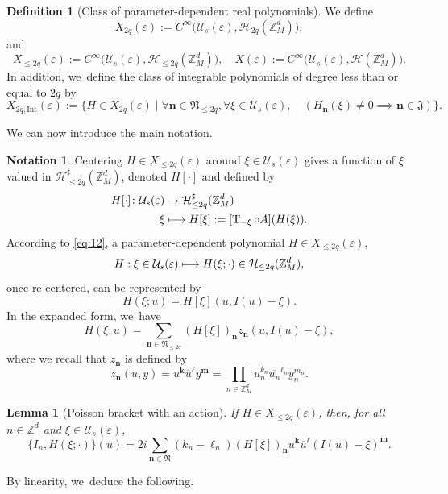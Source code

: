 \documentclass[JEP,XML,SOM,Unicode,published]{cedram}
\newcommand\mto{\mathchoice{\longmapsto}{\mapsto}{\mapsto}{\mapsto}}
\theoremstyle{plain}
\newtheorem{lemma}[theorem]{Lemma}
\theoremstyle{definition}
\newtheorem{definition}[theorem]{Definition}
\newtheorem{notation}[theorem]{Notation}
\newcommand{\nb}{{\boldsymbol n}}
\newcommand{\kb}{{\boldsymbol k}}
\newcommand{\lb}{{\boldsymbol \ell}}
\newcommand{\mb}{{\boldsymbol m}}
\newcommand{\Nb}{{\boldsymbol{\mathfrak{N}}}}
\newcommand{\Z}{\mathbb{Z}}
\newcommand{\1}{\mathbf{1}}
\let\epsilon\varepsilon
\begin{document}
\begin{definition}[Class of parameter-dependent real polynomials]
\label{def:class}
We define
\begin{equation}
\label{eq:X}
X_{2q}(\epsilon):= C^{\infty}
\big(
\mathcal{U}_{s}(\epsilon),\mathcal{H}_{2q}(\Z_{M}^{d})
\big),
\end{equation}
and
\[
X_{\leq 2q}(\epsilon):= C^{\infty}
\big(
\mathcal{U}_{s}(\epsilon),\mathcal{H}_{\leq 2q}(\Z_{M}^{d})
\big),
\quad
X(\epsilon):= C^{\infty}
\big(
\mathcal{U}_{s}(\epsilon),\mathcal{H}(\Z_{M}^{d})
\big).
\]
In addition, we~define the class of integrable polynomials of degree less than or equal to $2q$ by
\[
X_{2q,\mathrm{Int}}(\epsilon) :=
\{
H\in X_{2q}(\epsilon)\mid \forall \nb\in\Nb_{\leq2q},\forall \xi\in\mathcal{U}_{s}(\epsilon),\quad (H_{\nb}(\xi)\neq0 \implies \nb\in\mathfrak{J})
\}.
\]
\end{definition}

We can now introduce the main notation.
\begin{notation}
\label{not}
Centering $H\in X_{\leq2q}(\epsilon)$ around $\xi\in\mathcal{U}_{s}(\epsilon)$ gives a function of $\xi$ valued in $\mathcal{H}_{\leq 2q}^{\sharp}(\Z_{M}^{d})$, denoted $H[\cdot]$ and defined by
\[
\begin{aligned}
H[\cdot]\colon\mathcal{U}_{s}(\epsilon)&
\to\mathcal{H}_{\leq 2q}^{\sharp}(\Z_{M}^{d})\\
\xi&\mto H[\xi]:=[\operatorname{T}_{-\xi}\circ A](H(\xi)).
\end{aligned}
\]
According to \eqref{eq:12}, a parameter-dependent polynomial $H\in X_{\leq2q}(\epsilon)$,
\[
H: \xi\in\mathcal{U}_{s}(\epsilon)\mto H(\xi;\cdot) \in \mathcal{H}_{\leq2q}(\Z_{M}^{d}),
\]
once re-centered, can be represented by
\begin{equation}
\label{eq:H-cano}
H(\xi;u) = H[\xi](u,I(u)-\xi).
\end{equation}
In the expanded form, we~have
\[
H(\xi;u) = \sum_{\nb\in\Nb_{\leq2q}}(H[\xi])_{\nb}z_{\nb}(u,I(u)-\xi),
\]
where we recall that $z_{\nb}$ is defined by
\[
z_{\nb}(u,y) = u^{\kb}\overline{u}^{\lb}y^{\mb} = \prod_{n\in\Z_{M}^{d}}u_{n}^{k_{n}}\overline{u_{n}}^{\ell_{n}}y_{n}^{m_{n}}.
\]
\end{notation}

\begin{lemma}[Poisson bracket with an action] If $H\in X_{\leq2q}(\epsilon)$, then, for all $n\in\Z^{d}$ and $\xi\in\mathcal{U}_{s}(\epsilon)$,
\begin{equation}
\label{eq:brak-I}
\{I_{n},H(\xi;\cdot)\}(u)
= 2i\sum_{\nb\in\Nb}(k_{n}-\ell_{n})(H[\xi])_{\nb}u^{\kb}\overline{u}^{\lb}(I(u)-\xi)^{\mb}.
\end{equation}
\end{lemma}
By linearity, we~deduce the following.
\end{document}
